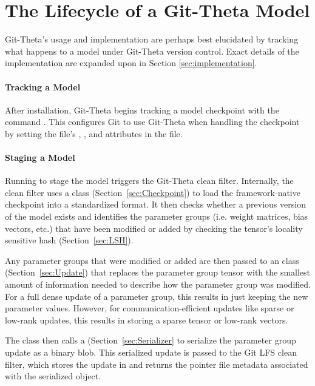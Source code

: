 \section{The Lifecycle of a Git-Theta Model}

Git-Theta's usage and implementation are perhaps best elucidated by tracking what happens to a model under Git-Theta version control. Exact details of the implementation are expanded upon in Section \ref{sec:implementation}.
\paragraph{Tracking a Model}
After installation, Git-Theta begins tracking a model checkpoint with the command . This configures Git to use Git-Theta when handling the checkpoint by setting the file's , , and  attributes in the  file. 

\paragraph{Staging a Model}
Running  to stage the model triggers the Git-Theta clean filter. Internally, the clean filter uses a  class (Section~\ref{sec:Checkpoint}) to load the framework-native checkpoint into a standardized format. It then checks whether a previous version of the model exists and identifies the parameter groups (i.e. weight matrices, bias vectors, etc.) that have been modified or added by checking the tensor's locality sensitive hash (Section~\ref{sec:LSH}).

Any parameter groups that were modified or added are then passed to an  class (Section~\ref{sec:Update}) that replaces the parameter group tensor with the smallest amount of information needed to describe how the parameter group was modified. For a full dense update of a parameter group, this results in just keeping the new parameter values. However, for communication-efficient updates like sparse or low-rank updates, this results in storing a sparse tensor or low-rank vectors.

The  class then  calls a  (Section~\ref{sec:Serializer} to serialize the parameter group update as a binary blob. This serialized update is passed to the Git LFS clean filter, which stores the update in  and returns the pointer file metadata associated with the serialized object.

